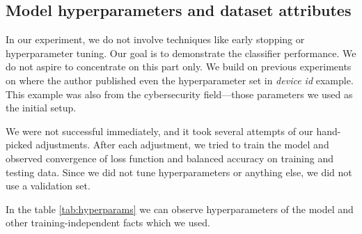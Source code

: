 
\subsection{Model hyperparameters and dataset attributes}
In our experiment, we do not involve techniques like early stopping or hyperparameter tuning. Our goal is to demonstrate the classifier performance. We do not aspire to concentrate on this part only. We build on previous experiments on \cite{Mandlik2020} where the author published even the hyperparameter set in \emph{device id} example. This example was also from the cybersecurity field—those parameters we used as the initial setup.

We were not successful immediately, and it took several attempts of our hand-picked adjustments. After each adjustment, we tried to train the model and observed convergence of loss function and balanced accuracy on training and testing data. Since we did not tune hyperparameters or anything else, we did not use a validation set. 

In the table \ref{tab:hyperparams} we can observe hyperparameters of the model and other training-independent facts which we used.


